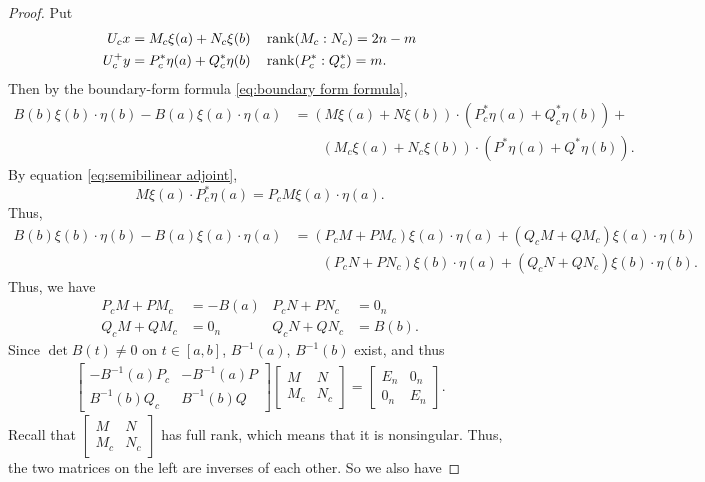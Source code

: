 \documentclass[11pt, oneside, a4paper]{article}
\begin{document}
\begin{proof}
    Put
    \begin{align*}
        U_cx &= M_c\xi(a) + N_c\xi(b)\quad \operatorname{rank}(M_c:N_c) = 2n-m\\
        U_c^+y &= P_c^*\eta(a) + Q_c^*\eta(b)\quad\operatorname{rank}(P_c^*:Q_c^*)=m.
    \end{align*}
    Then by the boundary-form formula \eqref{eq:boundary form formula},
    \begin{align*}
        B(b)\xi(b)\cdot \eta(b) - B(a)\xi(a)\cdot \eta(a) &= (M\xi(a) + N\xi(b))\cdot (P_c^*\eta(a) + Q_c^*\eta(b)) + \\
        &\qquad (M_c\xi(a) + N_c\xi(b))\cdot (P^*\eta(a) + Q^*\eta(b)).
    \end{align*}
    By equation \eqref{eq:semibilinear adjoint}, 
    \[M\xi(a)\cdot P_c^*\eta(a) = P_cM\xi(a)\cdot \eta(a).\]
    Thus,
    \begin{align*}
        B(b)\xi(b)\cdot \eta(b) - B(a)\xi(a)\cdot \eta(a) &= (P_c M + PM_c)\xi(a)\cdot \eta(a) + (Q_cM + QM_c)\xi(a)\cdot \eta(b) \\
        &\qquad (P_cN + PN_c) \xi(b)\cdot \eta(a) + (Q_cN + QN_c) \xi(b)\cdot \eta(b).
    \end{align*}
    Thus, we have
    \begin{align*}
        P_cM + PM_c &= - B(a) & P_cN + PN_c &= 0_n\\
        Q_cM + QM_c &= 0_n & Q_cN + QN_c &= B(b).
    \end{align*}
    Since $\det B(t)\neq 0$ on $t\in[a,b]$, $B^{-1}(a)$, $B^{-1}(b)$ exist, and thus
    \begin{align*}
        \begin{bmatrix}
            -B^{-1}(a)P_c & -B^{-1}(a)P\\
            B^{-1}(b)Q_c & B^{-1}(b)Q
        \end{bmatrix}
        \begin{bmatrix}
            M & N\\
            M_c & N_c
        \end{bmatrix}
        =
        \begin{bmatrix}
            E_n & 0_n\\
            0_n & E_n
        \end{bmatrix}.
    \end{align*}
    Recall that $\begin{bmatrix}
        M & N\\
        M_c & N_c
    \end{bmatrix}$ has full rank, which means that it is nonsingular. Thus, the two matrices on the left are inverses of each other. So we also have

\end{proof}
\end{document}
